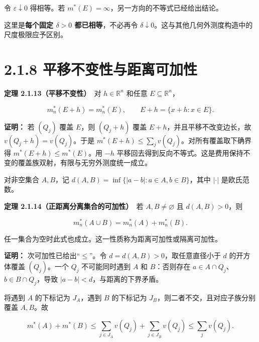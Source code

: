 \documentclass[11pt,a4paper]{article}
\begin{document}
令 \(\varepsilon\downarrow0\) 得相等。若
\(m^*(E)=\infty\)，另一方向的不等式已经给出结论。

这里是\textbf{每个固定 \(\delta>0\) 都已相等}，不必再令
\(\delta\downarrow0\)。这与其他几何外测度构造中的尺度极限应予区别。

\section[\S{}2.1.8
平移不变性与距离可加性]{2.1.8
平移不变性与距离可加性}\label{ux5e73ux79fbux4e0dux53d8ux6027ux4e0eux8dddux79bbux53efux52a0ux6027}

\textbf{定理 2.1.13（平移不变性）}　对 \(h\in\mathbb R^n\) 和任意
\(E\subseteq\mathbb R^n\)，

\begin{equation*}
m_n^*(E+h)=m_n^*(E),\qquad E+h=\{x+h:x\in E\}.
\tag{2.1.19}
\end{equation*}

\textbf{证明：} 若 \((Q_j)\) 覆盖 \(E\)，则 \((Q_j+h)\) 覆盖
\(E+h\)，并且平移不改变边长，故 \(v(Q_j+h)=v(Q_j)\)。于是
\(m^*(E+h)\le\sum_jv(Q_j)\)。对所有覆盖取下确界得
\(m^*(E+h)\le m^*(E)\)。用 \(-h\)
平移回去得到反向不等式。这是费用保持不变的覆盖族双射，有限与无穷外测度统一成立。

对非空集合 \(A,B\)，记 \(d(A,B)=\inf\{|a-b|:a\in A,b\in B\}\)，其中
\(|\cdot|\) 是欧氏范数。

\textbf{定理 2.1.14（正距离分离集合的可加性）}　若 \(A,B\ne\varnothing\)
且 \(d(A,B)>0\)，则

\begin{equation*}
m_n^*(A\cup B)=m_n^*(A)+m_n^*(B).
\tag{2.1.20}
\end{equation*}

任一集合为空时此式也成立。这一性质称为距离可加性或隔离可加性。

\textbf{证明：} 次可加性已给出``\(\le\)''。令
\(d=d(A,B)>0\)，取任意直径小于 \(d\) 的开方体覆盖 \((Q_j)\)。一个
\(Q_j\) 不可能同时遇到 \(A\) 和 \(B\)：否则存在
\(a\in A\cap Q_j\)、\(b\in B\cap Q_j\)，导致
\(|a-b|<d\)，与距离的下界矛盾。

将遇到 \(A\) 的下标记为 \(J_A\)，遇到 \(B\) 的下标记为
\(J_B\)，则二者不交，且对应子族分别覆盖 \(A,B\)。故

\begin{equation*}
m^*(A)+m^*(B)
\le\sum_{j\in J_A}v(Q_j)+\sum_{j\in J_B}v(Q_j)
\le\sum_jv(Q_j).
\tag{2.1.21}
\end{equation*}
\end{document}
